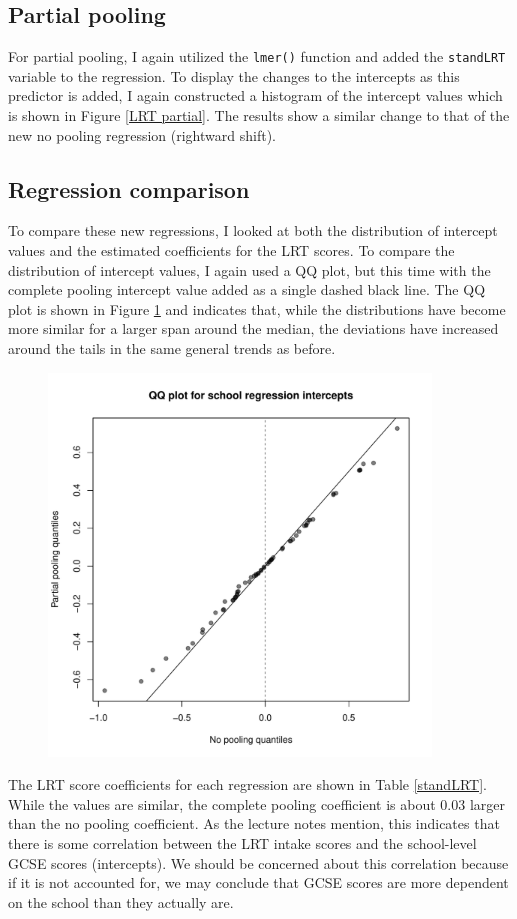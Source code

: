 \documentclass{article}
\begin{document}
\subsection{Partial pooling}
For partial pooling, I again utilized the \verb|lmer()| function and added the \verb|standLRT| variable to the regression. To display the changes to the intercepts as this predictor is added, I again constructed a histogram of the intercept values which is shown in Figure \ref{LRT partial}. The results show a similar change to that of the new no pooling regression (rightward shift). 

\subsection{Regression comparison}
To compare these new regressions, I looked at both the distribution of intercept values and the estimated coefficients for the LRT scores. To compare the distribution of intercept values, I again used a QQ plot, but this time with the complete pooling intercept value added as a single dashed black line. The QQ plot is shown in Figure \ref{compare LRT} and indicates that, while the distributions have become more similar for a larger span around the median, the deviations have increased around the tails in the same general trends as before.

\begin{figure}[H]
\centering
\includegraphics[width = 4in]{figures/comparison_LRT.pdf}
\caption{}
\label{compare LRT}
\end{figure}

The LRT score coefficients for each regression are shown in Table \ref{standLRT}. While the values are similar, the complete pooling coefficient is about $0.03$ larger than the no pooling coefficient. As the lecture notes mention, this indicates that there is some correlation between the LRT intake scores and the school-level GCSE scores (intercepts). We should be concerned about this correlation because if it is not accounted for, we may conclude that GCSE scores are more dependent on the school than they actually are.
\end{document}
